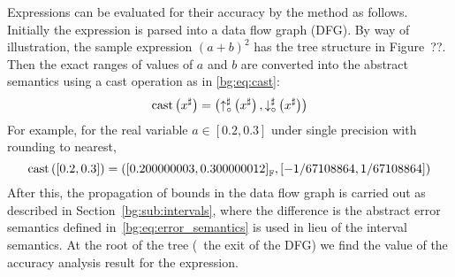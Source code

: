 Expressions can be evaluated for their accuracy by the method as follows.
Initially the expression is parsed into a data flow graph (DFG). By way of
illustration, the sample expression ${(a + b)}^2$ has the tree structure
in Figure~??. Then the exact ranges of values of $a$ and
$b$ are converted into the abstract semantics using a cast operation as in
\eqref{bg:eq:cast}:
\begin{equation}
    \mathrm{cast}\left(x^\sharp\right) = \left(
        \operatorname{\uparrow^\sharp_\circ}\left(x^\sharp\right), \operatorname{\downarrow^\sharp_\circ}\left(x^\sharp\right)
    \right)
    \label{bg:eq:cast}
\end{equation}
For example, for the real variable $a \in [0.2, 0.3]$ under single precision
with rounding to nearest,
\begin{equation}
    \mathrm{cast}\left([0.2, 0.3]\right) = \left(
        {\left[0.200000003, 0.300000012\right]}_\mathbb{F},
        \left[-1/67108864, 1/67108864\right]
    \right)
\end{equation}
After this, the propagation of bounds in the data flow graph is carried out as
described in Section~\ref{bg:sub:intervals}, where the difference is the abstract
error semantics defined in~\eqref{bg:eq:error_semantics} is used in lieu of the
interval semantics. At the root of the tree (\ie~the exit of the DFG) we find
the value of the accuracy analysis result for the expression.
